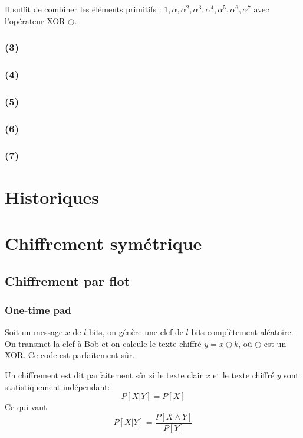 \documentclass[11pt,a4paper]{report}
\begin{document}
Il suffit de combiner les éléments primitifs : ${1,\alpha,\alpha^2,\alpha^3,\alpha^4,\alpha^5,\alpha^6,\alpha^7}$ avec l'opérateur XOR $\oplus$.

\subsection*{(3)}

\subsection*{(4)}

\subsection*{(5)}

\subsection*{(6)}

\subsection*{(7)}

\chapter{Historiques}

\chapter{Chiffrement symétrique}

\section{Chiffrement par flot}

\subsection{One-time pad}

Soit un message $x$ de $l$ bits, on génère une clef de $l$ bits complètement aléatoire. On transmet la clef à Bob et on calcule le texte chiffré $y=x\oplus k$, où $\oplus$ est un XOR. Ce code est parfaitement sûr.

Un chiffrement est dit parfaitement sûr si le texte clair $x$ et le texte chiffré $y$ sont statistiquement indépendant:
$$ P[X|Y] = P[X] $$
Ce qui vaut
$$ P[X|Y] = \frac{P[X \wedge Y]}{P[Y]} $$
\end{document}
